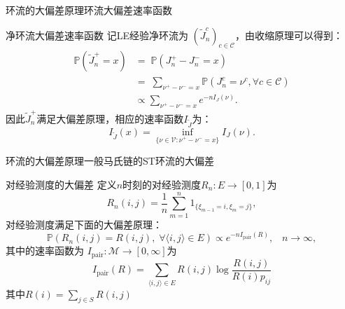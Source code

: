 \documentclass{beamer}
\begin{document}
\begin{frame}{环流的大偏差原理}{环流大偏差速率函数}
	\begin{block}{净环流大偏差速率函数}
		记LE经验净环流为 $(\tilde{J}^{c}_n)_{c\in\mathcal{C}}$，由收缩原理可以得到：
		\begin{align*}
			\mathbb{P}\left(\tilde{J}^{+}_n = x\right)
			 & =\;\mathbb{P}\left(J^{+}_n-J^{-}_n = x\right)                                             \\
			 & =\;\sum_{\nu^{+}-\nu^{-}=x}\mathbb{P}\left(J^{c}_n=\nu^{c},\forall c\in\mathcal{C}\right) \\
			 & \propto\sum_{\nu^{+}-\nu^{-}=x} e^{-nI_J(\nu)}.
		\end{align*}
		因此$\tilde{J}^+_n$满足大偏差原理，相应的速率函数$I_{\tilde{J}}$为：
		\begin{equation*}
			I_{\tilde{J}}(x)=\inf_{\{\nu\in\mathcal{V}:\nu^{+}-\nu^{-}= x\}}I_J(\nu).
		\end{equation*}
	\end{block}
\end{frame}

\begin{frame}{环流的大偏差原理}{一般马氏链的ST环流的大偏差}
	\begin{block}{对经验测度的大偏差}
		定义$n$时刻的对经验测度$R_n:E\rightarrow[0,1]$为
		\begin{equation*}
			R_n(i,j) = \frac{1}{n}\sum_{m=1}^n1_{\{\xi_{m-1}=i,\xi_m=j\}},
		\end{equation*}
		对经验测度满足下面的大偏差原理：
		\begin{equation*}
			\mathbb{P}(R_n(i,j)=R(i,j),\;\forall\langle i,j\rangle\in E)\propto e^{-nI_{\mathrm{pair}}(R)},\;\;\;n\to\infty,
		\end{equation*}
		其中的速率函数为 $I_{\mathrm{pair}}:\mathcal{M}\rightarrow[0,\infty]$为
		\begin{equation*}
			I_{\mathrm{pair}}(R) = \sum_{\langle i,j\rangle\in E}R(i,j)\log\frac{R(i,j)}{R(i)p_{ij}}
		\end{equation*}
		其中$R(i)=\sum_{j\in S}R(i,j)$
	\end{block}
\end{frame}
\end{document}
